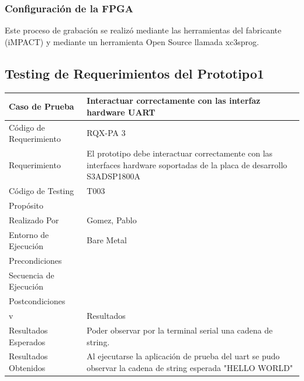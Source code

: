 		
		\subsubsection{Configuración de la FPGA}
		Este proceso de grabación se realizó mediante las herramientas del fabricante (iMPACT) y mediante un herramienta Open Source llamada xc3sprog. 
		
		\subsection{Testing de Requerimientos del Prototipo1}

		

\begin{table}[!h]
		\centering
		\begin{tabular}{ p{5cm} p{10cm}  }
		\hline 
	\rowcolor[gray]{0.8}  Caso de Prueba&  Interactuar correctamente con las interfaz hardware UART\\
		\hline 
		Código de Requerimiento & RQX-PA 3\\ 
		\hline 
		Requerimiento  &  El prototipo debe interactuar correctamente con las interfaces hardware soportadas de la placa de desarrollo S3ADSP1800A\\ 
		\hline 
		Código de Testing & T003\\ 
		\hline
		Propósito &  \\
		\hline
		Realizado Por & Gomez, Pablo \\
		\hline	
		Entorno de Ejecución & Bare Metal \\
		\hline
		Precondiciones &  \\
		\hline
		Secuencia de Ejecución &  \\
		\hline
		Postcondiciones & \\
		\hline
		\rowcolor[gray]{0.8}  v&Resultados\\
		\hline
		Resultados Esperados & Poder observar por la terminal serial una cadena de string.\\
		\hline	
		Resultados Obtenidos & Al ejecutarse la aplicación de prueba del uart se pudo observar la cadena de string esperada "HELLO WORLD" \\
		\hline
		\end{tabular}
		\end{table}


